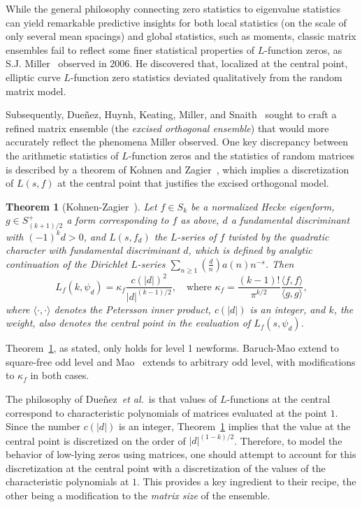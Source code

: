 \documentclass[11pt,reqno]{amsart} \usepackage{fullpage}
\newtheorem{theorem}[lemma]{Theorem}
\renewcommand{\geq}{\geqslant}
\newcommand\be{\begin{equation}}
\newcommand\ee{\end{equation}}
\newcommand{\etal}{\textit{et al.}}
\numberwithin{equation}{section}
\begin{document}
While the general philosophy connecting zero statistics to eigenvalue statistics can yield
remarkable predictive insights for both local statistics (on the scale of only several mean
spacings) and global statistics, such as moments, classic matrix ensembles fail to reflect
some finer statistical properties of $L$-function zeros, as S.J. Miller~\cite{mil06}
observed in 2006. He discovered that, localized at the central point, elliptic curve
$L$-function zero statistics deviated qualitatively from the random matrix model.

Subsequently, Dueñez, Huynh, Keating, Miller, and Snaith~\cite{DHKMS} sought to craft a
refined matrix ensemble (the \textit{excised orthogonal ensemble}) that would more
accurately reflect the phenomena Miller observed. 
One key discrepancy between the arithmetic statistics of $L$-function zeros and the
statistics of random matrices is described by a theorem of Kohnen and Zagier~\cite{KZ},
which implies a discretization of $L(s,f)$ at the central
point that justifies the excised orthogonal model.

\begin{theorem}[Kohnen-Zagier~\cite{KZ}]\label{KZthm}
  Let $f\in S_k$ be a normalized Hecke eigenform, $g\in S_{(k+1)/2}^+$ a form
  corresponding to $f$ as above, $d$ a fundamental discriminant with $(-1)^kd>0$,
  and $L(s,f_d)$ the $L$-series of $f$ twisted by the quadratic character
  with fundamental discriminant $d$, which is defined by analytic
  continuation of the Dirichlet $L$-series
  $\sum_{n\geq1}\left(\frac d n\right)a(n)n^{-s}$. Then
  \be L_f(k,\psi_d) = \kappa_f \frac{c(|d|)^2}{|d|^{(k-1)/2}},\quad\text{where }
  \kappa_f = \frac{(k-1)!}{\pi^{k/2}}\frac{\langle f,f\rangle}{\langle g,g\rangle},\ee
  where $\langle\cdot,\cdot\rangle$ denotes the Petersson inner product,
  $c(|d|)$ is an integer, and $k$, the weight, also denotes the central point in
  the evaluation of $L_f(s,\psi_d)$.
\end{theorem}
Theorem~\ref{KZthm}, as stated, only holds for level 1 newforms. Baruch-Mao \cite{BM}
extend to square-free odd level and Mao~\cite{mao} extends to arbitrary odd level,
with modifications to $\kappa_f$ in both cases.

The philosophy of Dueñez~\etal\ is that values of $L$-functions at the
central correspond to characteristic polynomials of matrices evaluated at the point $1$.
Since the number $c(|d|)$ is an integer, Theorem~\ref{KZthm} implies that the value at
the central point is discretized on the order of $|d|^{(1-k)/2}$. Therefore, to model
the behavior of low-lying zeros using matrices, one should attempt to account for this
discretization at the central point with a discretization of the values of the
characteristic polynomials at $1$.
This provides a key ingredient to their recipe, the other being a modification to the
\textit{matrix size} of the ensemble.
\end{document}
